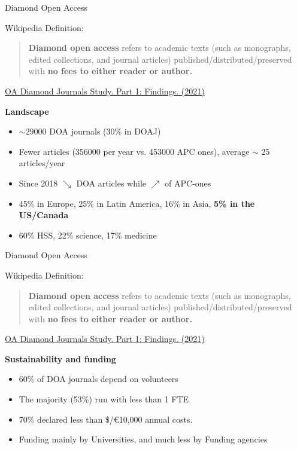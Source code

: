 \documentclass[10pt,compress,serif,aspectratio=169]{beamer}
\begin{document}
\begin{frame}[t]{Diamond Open Access}

Wikipedia Definition:\newline \newline
 \begin{quote}
   \textbf{Diamond open access} refers to academic texts (such as monographs, edited collections, and journal articles) published/distributed/preserved with \textbf{no fees to either reader or author.} \newline
 \end{quote}
 \pause
\href{https://doi.org/10.5281/zenodo.4558704}{OA Diamond Journals Study. Part 1: Findings. (2021)\newline}

\textbf{Landscape}\\
\begin{itemize}
\item $\sim 29000$ DOA journals (30\% in DOAJ)
\item Fewer articles (356000 per year vs. 453000 APC ones), average $\sim$ 25 articles/year
\item Since 2018 $\searrow$ DOA articles while $\nearrow$ of APC-ones
\item 45\% in Europe, 25\% in Latin America, 16\% in Asia, \textbf{5\% in the US/Canada}
\item 60\% HSS, 22\% science, 17\% medicine
\end{itemize}

\end{frame}


\begin{frame}[t]{Diamond Open Access}

Wikipedia Definition:\newline \newline
 \begin{quote}
   \textbf{Diamond open access} refers to academic texts (such as monographs, edited collections, and journal articles) published/distributed/preserved with \textbf{no fees to either reader or author.} \newline
 \end{quote}

\href{https://doi.org/10.5281/zenodo.4558704}{OA Diamond Journals Study. Part 1: Findings. (2021)\newline}

\textbf{Sustainability and funding}\\
\begin{itemize}
  \item 60\% of DOA journals depend on volunteers
  \item The majority (53\%) run with less than 1 FTE
  \item 70\% declared less than \$/€10,000 annual costs.
  \item Funding mainly by Universities, and much less by Funding agencies
\end{itemize}
\end{frame}
\end{document}
